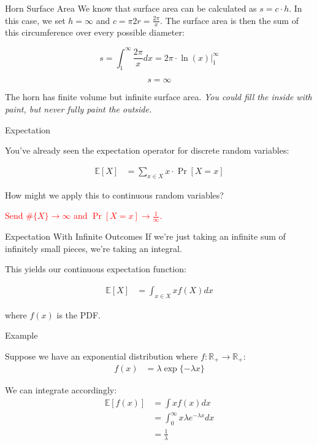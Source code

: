 \documentclass[10pt]{beamer}
\begin{document}
\begin{frame}{Horn Surface Area}
    We know that surface area can be calculated as $s = c \cdot h$. In this case, we set $h = \infty$ and $c = \pi 2r = \frac{2\pi}{x}$. The surface area is then the sum of this circumference over every possible diameter:

    \[s = \int_1^{\infty} \frac{2 \pi}{x} dx = 2\pi \cdot \ln(x) \bigg|_1^{\infty}\]

    \[s = \infty\]

The horn has finite volume but infinite surface area. \textit{You could fill the inside with paint, but never fully paint the outside.}
\end{frame}


\begin{frame}{Expectation}

You've already seen the expectation operator for discrete random variables:

\begin{align*}
    \mathbb{E}[X] &= \sum_{x \in X}x \cdot \Pr[X = x]
\end{align*}

How might we apply this to continuous random variables?
\pause

\textcolor{red}{Send $\#\{X\} \to \infty$ and $\Pr[X = x] \to \frac{1}{\infty}$.} 

\end{frame}

\begin{frame}{Expectation With Infinite Outcomes}
    If we're just taking an infinite sum of infinitely small pieces, we're taking an integral.

    This yields our continuous expectation function:

    \begin{align*}
        \mathbb{E}[X] &= \int_{x \in X} x f(X) dx
    \end{align*}

    where $f(x)$ is the PDF.
\end{frame}

\begin{frame}{Example}

    Suppose we have an exponential distribution where $f: \mathbb{R}_+ \to \mathbb{R}_+$:
    \begin{align*}
        f(x) &= \lambda \exp\{- \lambda x\}
    \end{align*}

    \pause

    We can integrate accordingly:
    \begin{align*}
        \mathbb{E}[f(x)] &= \int x f(x) dx \\
        &= \int_{0}^\infty x \lambda e^{- \lambda x} dx \\
        &= \frac{1}{\lambda}
    \end{align*}

\end{frame}
\end{document}
